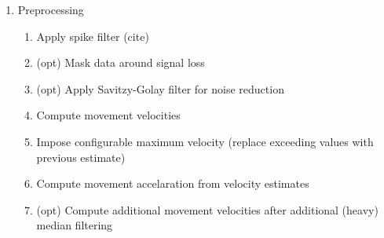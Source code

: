 \documentclass[10pt,a4paper]{extarticle}
\begin{document}
\begin{enumerate}
  \item Preprocessing
    \begin{enumerate}
      \item Apply spike filter (cite)
      \item (opt) Mask data around signal loss
      \item (opt) Apply Savitzy-Golay filter for noise reduction
      \item Compute movement velocities
      \item Impose configurable maximum velocity (replace exceeding values with previous estimate)
      \item Compute movement accelaration from velocity estimates
      \item (opt) Compute additional movement velocities after additional (heavy) median filtering


\end{enumerate}
\end{enumerate}
\end{document}
